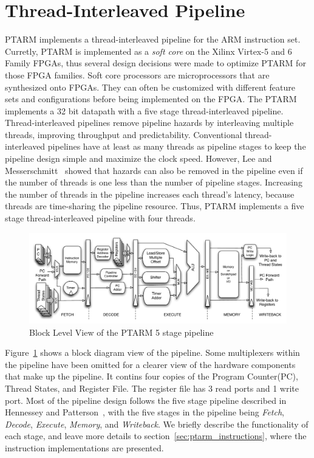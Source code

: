 \section{Thread-Interleaved Pipeline}
PTARM implements a thread-interleaved pipeline for the ARM instruction set.
Curretly, PTARM is implemented as a \emph{soft core} on the Xilinx Virtex-5 and 6 Family FPGAs, thus several design decisions were made to optimize PTARM for those FPGA families.
Soft core processors are microprocessors that are synthesized onto FPGAs.
They can often be customized with different feature sets and configurations before being implemented on the FPGA.  
The PTARM implements a 32 bit datapath with a five stage thread-interleaved pipeline.
Thread-interleaved pipelines remove pipeline hazards by interleaving multiple threads, improving throughput and predictability. 
Conventional thread-interleaved pipelines have at least as many threads as pipeline stages to keep the pipeline design simple and maximize the clock speed.
However, Lee and Messerschmitt~\cite{lee1987pip} showed that hazards can also be removed in the pipeline even if the number of threads is one less than the number of pipeline stages.  
Increasing the number of threads in the pipeline increases each thread's latency, because threads are time-sharing the pipeline resource. 
Thus, PTARM implements a five stage thread-interleaved pipeline with four threads.

\begin{figure}[b]
  \vspace{-20pt}
  \begin{center}
    \includegraphics[scale=.54]{figs/ptarm_pipeline_five_stage}
  \end{center}
  \vspace{-20pt}
  \caption{Block Level View of the PTARM 5 stage pipeline}
  \label{fig:ptarm_pipeline_five_stage}
\end{figure}

Figure~\ref{fig:ptarm_pipeline_five_stage} shows a block diagram view of the pipeline. 
Some multiplexers within the pipeline have been omitted for a clearer view of the hardware components that make up the pipeline.
It contins four copies of the Program Counter(PC), Thread States, and Register File.
The register file has 3 read ports and 1 write port.
Most of the pipeline design follows the five stage pipeline described in Hennessey and Patterson~\cite{Hennessey2007CompArch}, with the five stages in the pipeline being \emph{Fetch}, \emph{Decode}, \emph{Execute}, \emph{Memory}, and \emph{Writeback}.
We briefly describe the functionality of each stage, and leave more details to section~\ref{sec:ptarm_instructions}, where the instruction implementations are presented.

